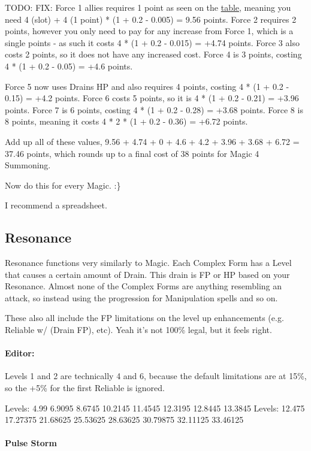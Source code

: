 \begin{multicols*}{2}
	
	
	TODO: FIX: Force 1 allies requires 1 point as seen on the \hyperref[spirit_ally_cost]{table}, meaning you need 4 (slot) + 4 (1 point) * (1 + 0.2 - 0.005) = 9.56 points. Force 2 requires 2 points, however you only need to pay for any increase from Force 1, which is a single points - as such it costs 4 * (1 + 0.2 - 0.015) = +4.74 points. Force 3 also costs 2 points, so it does not have any increased cost. Force 4 is 3 points, costing 4 * (1 + 0.2 - 0.05) = +4.6 points. 
	
	Force 5 now uses Drains HP and also requires 4 points, costing 4 * (1 + 0.2 - 0.15) = +4.2 points. Force 6 costs 5 points, so it is 4 * (1 + 0.2 - 0.21) = +3.96 points. Force 7 is 6 points, costing 4 * (1 + 0.2 - 0.28) = +3.68 points. Force 8 is 8 points, meaning it costs 4 * 2 * (1 + 0.2 - 0.36) = +6.72 points.
	
	Add up all of these values, 9.56 + 4.74 + 0 + 4.6 + 4.2 + 3.96 + 3.68 + 6.72 = 37.46 points, which rounds up to a final cost of 38 points for Magic 4 Summoning.
	
	Now do this for every Magic. :\}
	
	I recommend a spreadsheet.
	
	\subsection{Resonance}
	
	Resonance functions very similarly to Magic. Each Complex Form has a Level that causes a certain amount of Drain. This drain is FP or HP based on your Resonance. Almost none of the Complex Forms are anything resembling an attack, so instead using the progression for Manipulation spells and so on.
	
	These also all include the FP limitations on the level up enhancements (e.g. Reliable w/ (Drain FP), etc). Yeah it's not 100\% legal, but it feels right.
	
	\paragraph{Editor:} 
	Levels 1 and 2 are technically 4 and 6, because the default limitations are at 15\%, so the +5\% for the first Reliable is ignored.	
	
	Levels: 4.99 6.9095 8.6745 10.2145 11.4545 12.3195 12.8445 13.3845
	Levels: 12.475 17.27375 21.68625 25.53625 28.63625 30.79875 32.11125 33.46125
	
	\paragraph{Pulse Storm}
	

\end{multicols*}
